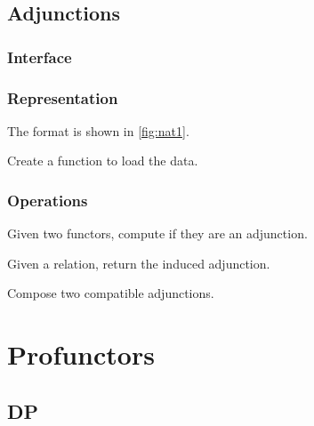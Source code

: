 \begin{exercise}
\section{Adjunctions}

\subsection*{Interface}

\subsection*{Representation}

The format is shown in \cref{fig:nat1}.



\begin{exercise}
Create a function to load the data.

%
\end{exercise}

\subsection{Operations}
\begin{exercise}
Given two functors, compute if they are an adjunction.

\end{exercise}

\begin{exercise}
Given a relation, return the induced adjunction.
\end{exercise}


\begin{exercise}
Compose two compatible adjunctions.
\end{exercise}


\chapter{Profunctors}


\section{DP}

\label{sec:exercises-DP}


\end{exercise}
